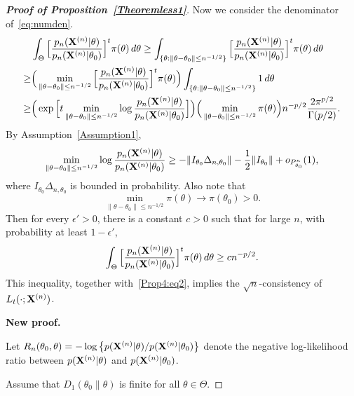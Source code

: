 \documentclass[11pt]{article}
\theoremstyle{plain}
\theoremstyle{definition}
\theoremstyle{remark}
\begin{document}
\begin{appendices}
\begin{proof}[\textbf{Proof of Proposition~\ref{Theoremless1}}]
    Now we consider the denominator of~\eqref{eq:numden}.
    $$
    \begin{aligned}
        & \int_{\Theta}\Big[\frac{p_n(\mathbf{X}^{(n)}|\theta)}{p_n(\mathbf{X}^{(n)}|\theta_0)}\Big]^{t} \pi(\theta)\, d\theta
        \geq
        \int_{\{\theta:\|\theta-\theta_0\|\leq n^{-1/2}\}}\Big[\frac{p_n(\mathbf{X}^{(n)}|\theta)}{p_n(\mathbf{X}^{(n)}|\theta_0)}\Big]^{t} \pi(\theta)\, d\theta
        \\
        \geq &
        \Big(
        \min_{\|\theta-\theta_0\|\leq n^{-1/2}} 
\Big[\frac{p_n(\mathbf{X}^{(n)}|\theta)}{p_n(\mathbf{X}^{(n)}|\theta_0)}\Big]^{t} \pi(\theta)
        \Big)
        \int_{\{\theta:\|\theta-\theta_0\|\leq n^{-1/2}\}}1\, d\theta\\
        \geq&
        \Big(
        \exp
\Big[
        t\min_{\|\theta-\theta_0\|\leq n^{-1/2}} 
        \log\frac{p_n(\mathbf{X}^{(n)}|\theta)}{p_n(\mathbf{X}^{(n)}|\theta_0)}
        \Big]
        \Big)
        \Big(\min_{\|\theta-\theta_0\|\leq n^{-1/2}} 
        \pi(\theta)
        \Big)
        n^{-p/2}\frac{2\pi^{p/2}}{\Gamma(p/2)}.
    \end{aligned}
    $$
    By Assumption~\ref{Assumption1},
    $$
   \begin{aligned} 
        \min_{\|\theta-\theta_0\|\leq n^{-1/2}} 
        \log\frac{p_n(\mathbf{X}^{(n)}|\theta)}{p_n(\mathbf{X}^{(n)}|\theta_0)}
        \geq
        -\|I_{\theta_0}\Delta_{n,\theta_0}\|-\frac{1}{2}\|I_{\theta_0}\|+
        o_{P^n_{\theta_0}}(1),
   \end{aligned}
    $$
    where
    $I_{\theta_0}\Delta_{n,\theta_0}$
    is bounded in probability.
    Also note that 
    $$\min_{\|\theta-\theta_0\|\leq n^{-1/2}} \pi(\theta)\to \pi(\theta_0)>0.$$
    Then for every $\epsilon'>0$, there is a constant $c>0$ such that for large $n$, with probability at least $1-\epsilon'$,
    $$
         \int_{\Theta}\Big[\frac{p_n(\mathbf{X}^{(n)}|\theta)}{p_n(\mathbf{X}^{(n)}|\theta_0)}\Big]^{t} \pi(\theta)\, d\theta\geq c n^{-p/2}.
    $$
    This inequality, together with~\eqref{Prop4:eq2}, implies the $\sqrt{n}$-consistency of $L_t(\cdot;\mathbf{X}^{(n)})$.


    \vspace{3em}
    \noindent \textbf{New proof.}

    Let $R_n (\theta_0, \theta)= - \log \left\{ p(\mathbf{X}^{(n)}|\theta)/ p(\mathbf{X}^{(n)}|\theta_0) \right\}$ denote the negative log-likelihood ratio between $p(\mathbf{X}^{(n)} | \theta )$ and $ p(\mathbf{X}^{(n)} | \theta_0)$.

    Assume that $D_1(\theta_0 \| \theta)$ is finite for all $\theta \in \Theta$.


\end{proof}
\end{appendices}
\end{document}
